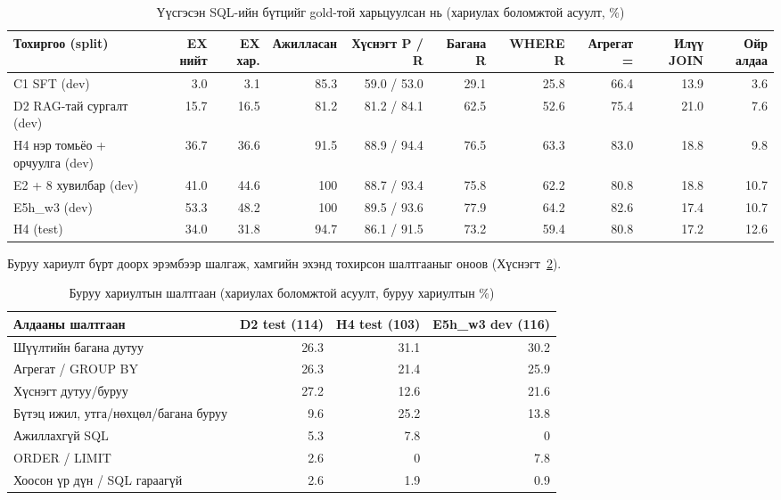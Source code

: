 \begin{table}[H]
\centering\small
\caption{Үүсгэсэн SQL-ийн бүтцийг gold-той харьцуулсан нь (хариулах боломжтой асуулт, \%)}
\label{tab:sql-structure}
\begin{adjustbox}{max width=\textwidth}
\begin{tabular}{lrrrrrrrrr}
\toprule
Тохиргоо (split) & EX нийт & EX хар. & Ажилласан & Хүснэгт P / R & Багана R & WHERE R & Агрегат = & Илүү JOIN & Ойр алдаа \\
\midrule
C1 SFT (dev) & 3.0 & 3.1 & 85.3 & 59.0 / 53.0 & 29.1 & 25.8 & 66.4 & 13.9 & 3.6 \\
D2 RAG-тай сургалт (dev) & 15.7 & 16.5 & 81.2 & 81.2 / 84.1 & 62.5 & 52.6 & 75.4 & 21.0 & 7.6 \\
H4 нэр томьёо + орчуулга (dev) & 36.7 & 36.6 & 91.5 & 88.9 / 94.4 & 76.5 & 63.3 & 83.0 & 18.8 & 9.8 \\
E2 + 8 хувилбар (dev) & 41.0 & 44.6 & 100 & 88.7 / 93.4 & 75.8 & 62.2 & 80.8 & 18.8 & 10.7 \\
E5h\_w3 (dev) & 53.3 & 48.2 & 100 & 89.5 / 93.6 & 77.9 & 64.2 & 82.6 & 17.4 & 10.7 \\
H4 (test) & 34.0 & 31.8 & 94.7 & 86.1 / 91.5 & 73.2 & 59.4 & 80.8 & 17.2 & 12.6 \\
\bottomrule
\end{tabular}
\end{adjustbox}
\end{table}

Буруу хариулт бүрт доорх эрэмбээр шалгаж, хамгийн эхэнд тохирсон шалтгааныг оноов (Хүснэгт~\ref{tab:err-cause}).

\begin{table}[H]
\centering\small
\caption{Буруу хариултын шалтгаан (хариулах боломжтой асуулт, буруу хариултын \%)}
\label{tab:err-cause}
\begin{tabularx}{\textwidth}{X r r r}
\toprule
Алдааны шалтгаан & D2 test (114) & H4 test (103) & E5h\_w3 dev (116) \\
\midrule
Шүүлтийн багана дутуу & 26.3 & 31.1 & 30.2 \\
Агрегат / GROUP BY & 26.3 & 21.4 & 25.9 \\
Хүснэгт дутуу/буруу & 27.2 & 12.6 & 21.6 \\
Бүтэц ижил, утга/нөхцөл/багана буруу & 9.6 & 25.2 & 13.8 \\
Ажиллахгүй SQL & 5.3 & 7.8 & 0 \\
ORDER / LIMIT & 2.6 & 0 & 7.8 \\
Хоосон үр дүн / SQL гараагүй & 2.6 & 1.9 & 0.9 \\
\bottomrule
\end{tabularx}
\end{table}

